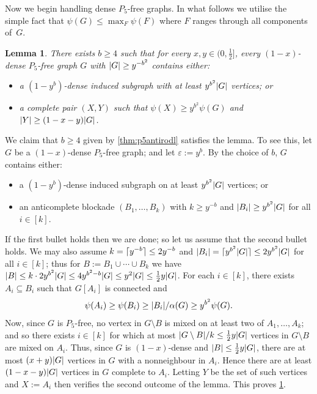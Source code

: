 \documentclass[11pt,reqno]{amsart}
\newtheorem{lemma}[theorem]{Lemma}
\let\oldendproof\endproof
\renewenvironment{proof}[1][\proofname]{%
	\oldproof[\normalfont\bfseries #1]%
}{\oldendproof}
\newcommand{\eps}{\varepsilon}
\renewcommand{\subset}{\subseteq}
\DeclarePairedDelimiter\abs{\lvert}{\rvert}%
\DeclarePairedDelimiter\ceil{\lceil}{\rceil}%
\begin{document}
	Now we begin handling dense $P_5$-free graphs.
	In what follows we utilise the simple fact that $\psi(G)\le\max_F\psi(F)$ where $F$ ranges through all components of~$G$.
	\begin{lemma}
		\label{lem:p5coml}
		There exists $b\ge4$ such that for every $x,y\in(0,\frac12]$, every $(1-x)$-dense $P_5$-free graph $G$ with $\abs G\ge y^{-b^2}$ contains either:
		\begin{itemize}
			\item a $(1-y^b)$-dense induced subgraph with at least $y^{b^2}\abs G$ vertices; or
			
			\item a complete pair $(X,Y)$ such that $\psi(X)\ge y^{b^2}\psi(G)$ and $\abs Y\ge(1-x-y)\abs G$.
		\end{itemize}
	\end{lemma}
	\begin{proof}
		We claim that $b\ge4$ given by \cref{thm:p5antirodl} satisfies the lemma.
		To see this,
		let $G$ be a $(1-x)$-dense $P_5$-free graph;
		and let $\eps:=y^b$.
		By the choice of $b$, $G$ contains either:
		\begin{itemize}
			\item a $(1-y^b)$-dense induced subgraph on at least $y^{b^2}\abs G$ vertices; or
			
			\item an anticomplete blockade $(B_1,\ldots,B_k)$ with $k\ge y^{-b}$ and $\abs{B_i}\ge y^{b^2}\abs G$ for all $i\in[k]$.
		\end{itemize}
		
		If the first bullet holds then we are done; so let us assume that the second bullet holds.
		We may also assume $k=\ceil{y^{-b}}\le2y^{-b}$ and $\abs{B_i}=\ceil{y^{b^2}\abs G}\le 2y^{b^2}\abs G$ for all $i\in[k]$;
		thus for $B:=B_1\cup\cdots\cup B_k$ we have $\abs B\le k\cdot 2y^{b^2}\abs G\le 4y^{b^2-b}\abs G\le y^2\abs G\le\frac12 y\abs G$.
		For each $i\in[k]$, there exists $A_i\subset B_i$ such that $G[A_i]$ is connected and
		$$\psi(A_i)\ge\psi(B_i)\ge \abs{B_i}/\alpha(G)\ge y^{b^2}\psi(G).$$
		Now, since $G$ is $P_5$-free, no vertex in $G\setminus B$ is mixed on at least two of $A_1,\ldots,A_k$;
		and so there exists $i\in[k]$ for which at most $\abs{G\setminus B}/k\le \frac12y\abs G$ vertices in $G\setminus B$ are mixed on $A_i$.
		Thus, since $G$ is $(1-x)$-dense and $\abs B\le \frac12y\abs G$, there are at most $(x+y)\abs G$ vertices in $G$ with a nonneighbour in $A_i$.
		Hence there are at least $(1-x-y)\abs G$ vertices in $G$ complete to $A_i$.
		Letting $Y$ be the set of such vertices and $X:=A_i$ then verifies the second outcome of the lemma.
		This proves \cref{lem:p5coml}.
	\end{proof}
\end{document}
